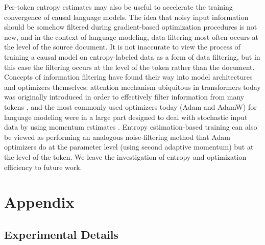 \documentclass{article}
\newcommand{\beginsupplement}{%
        \setcounter{table}{0}
        \renewcommand{\thetable}{S\arabic{table}}%
        \renewcommand{\theHtable}{S\arabic{figure}}
        \setcounter{figure}{0}
        \renewcommand{\thefigure}{S\arabic{figure}}%
        \renewcommand{\theHfigure}{S\arabic{figure}}
        \setcounter{section}{0}
        \renewcommand{\thesection}{S\arabic{section}}%
        \renewcommand{\theHsection}{S\arabic{section}}%
     }
\begin{document}
    Per-token entropy estimates may also be useful to accelerate the training convergence of causal language models. The idea that noisy input information should be somehow filtered during gradient-based optimization procedures is not new, and in the context of language modeling, data filtering most often occurs at the level of the source document.  It is not inaccurate to view the process of training a causal model on entropy-labeled data as a form of data filtering, but in this case the filtering occurs at the level of the token rather than the document. Concepts of information filtering have found their way into model architectures and optimizers themselves: attention mechanism ubiquitous in transformers today was originally introduced in order to effectively filter information from many tokens \citep{bahdanau2016neuralmachinetranslationjointly}, and the most commonly used optimizers today (Adam and AdamW) for language modeling were in a large part designed to deal with stochastic input data by using momentum estimates \citep{kingma2017}. Entropy estimation-based training can also be viewed as performing an analogous noise-filtering method that Adam optimizers do at the parameter level (using second adaptive momentum) but at the level of the token. We leave the investigation of entropy and optimization efficiency to future work.


  
\beginsupplement{}
\section{Appendix}

    \subsection{Experimental Details}
\end{document}
